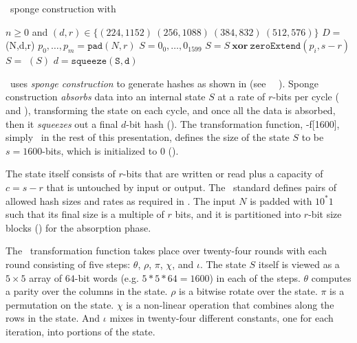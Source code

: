 \begin{algorithm}[t]
  \caption{\shaThree\ sponge construction with \keccak}\label{alg:sha3}
  \begin{algorithmic}[1]
    \Require $n \geq 0$ and $(d,r) \in \{(224, 1152)\ (256, 1088)\ (384, 832)\ (512, 576)\}$
    \Ensure $D =$ \shaThree(N,d,r)
    \State $p_0, \ldots, p_m = \mathtt{pad}(N, r)$\label{line:pad}
    \State $S = 0_0, \ldots, 0_{1599}$\label{line:init}
      \State $S = S\ \mathbf{xor}\ \mathtt{zeroExtend}(p_i, s-r)$\label{line:absorb}
      \State $S =$ \keccak$(S)$\label{line:keccak}
    \EndFor
    \State $d = \mathtt{squeeze(S,d)}$\label{line:squeeze}
  \end{algorithmic}
\end{algorithm}

\shaThree\ uses \emph{sponge construction} to generate hashes as shown in  (see \nist\ \fips\ \cite{fips202}).
Sponge construction \emph{absorbs} data into an internal state $S$ at a rate of $r$-bits per cycle ( and ), transforming the state on each cycle, and once all the data is absorbed, then it \emph{squeezes} out a final $d$-bit hash ().
The transformation function, \keccak-f[1600], simply \keccak\ in the rest of this presentation, defines the size of the state $S$ to be $s = 1600$-bits, which is initialized to 0 ().

The state itself consists of $r$-bits that are written or read plus a capacity of $c = s - r$ that is untouched by input or output.
The \nist\ standard defines pairs of allowed hash sizes and rates as required in . The input $N$ is padded with $10^*1$ such that its final size is a multiple of $r$ bits, and it is partitioned into $r$-bit size blocks () for the absorption phase.

The \keccak\ transformation function takes place over twenty-four rounds with each round consisting of five steps: $\theta$, $\rho$, $\pi$, $\chi$, and $\iota$. The state $S$ itself is viewed as a $5 \times 5$ array of $64$-bit words (e.g. $5 * 5 * 64 = 1600$) in each of the steps. $\theta$ computes a parity over the columns in the state. $\rho$ is a bitwise rotate over the state. $\pi$ is a permutation on the state. $\chi$ is a non-linear operation that combines along the rows in the state. And $\iota$ mixes in twenty-four different constants, one for each iteration, into portions of the state.
